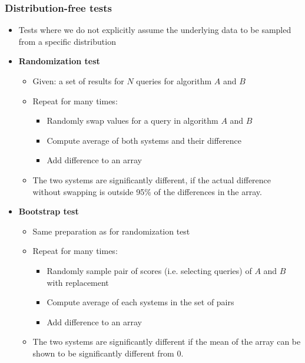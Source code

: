 \subsubsection{Distribution-free tests}
\begin{itemize}
	\item Tests where we do not explicitly assume the underlying data to be sampled from a specific distribution
	\item \textbf{Randomization test}
	\begin{itemize}
		\item Given: a set of results for $N$ queries for algorithm $A$ and $B$
		\item Repeat for many times:
		\begin{itemize}
			\item Randomly swap values for a query in algorithm $A$ and $B$
			\item Compute average of both systems and their difference
			\item Add difference to an array
		\end{itemize} 
		\item The two systems are significantly different, if the actual difference without swapping is outside 95\% of the differences in the array.
	\end{itemize}
	\item \textbf{Bootstrap test}
	\begin{itemize}
		\item Same preparation as for randomization test
		\item Repeat for many times:
		\begin{itemize}
			\item Randomly sample pair of scores (i.e. selecting queries) of $A$ and $B$ with replacement
			\item Compute average of each systems in the set of pairs
			\item Add difference to an array
		\end{itemize}
		\item The two systems are significantly different if the mean of the array can be shown to be significantly different from 0.
	\end{itemize}
	
\end{itemize}